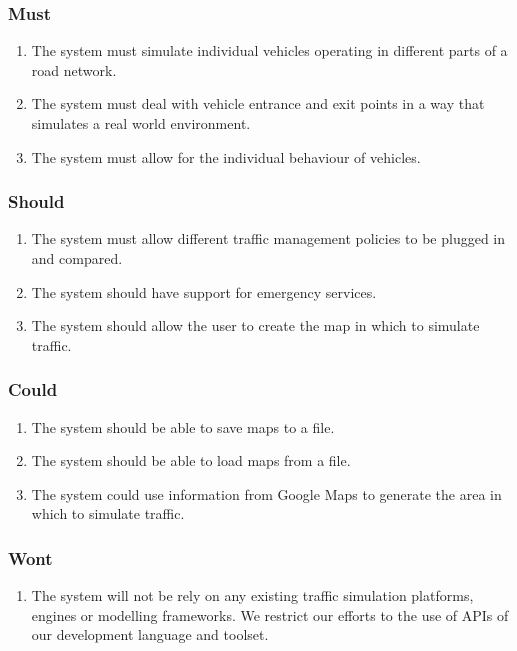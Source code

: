\documentclass[11pt,a4paper]{article}
\begin{document}
\subsubsection{Must}
\begin{enumerate}
  \item The system must simulate individual vehicles operating in different parts of a road network.
  \item The system must deal with vehicle entrance and exit points in a way that simulates a real world environment.
  \item The system must allow for the individual behaviour of vehicles.
\end{enumerate}

\subsubsection{Should}
\begin{enumerate}
  \item The system must allow different traffic management policies to be plugged in and compared.
  \item The system should have support for emergency services.
  \item The system should allow the user to create the map in which to simulate traffic.

\end{enumerate}

\subsubsection{Could}
\begin{enumerate}
  \item The system should be able to save maps to a file.
  \item The system should be able to load maps from a file.
  \item The system could use information from Google Maps to generate the area in which to simulate traffic.
\end{enumerate}

\subsubsection{Wont}
\begin{enumerate}
  \item The system will not be rely on any existing traffic simulation platforms, engines or modelling frameworks.  We restrict our efforts to the use of APIs of our development language and toolset.
\end{enumerate}
\end{document}
